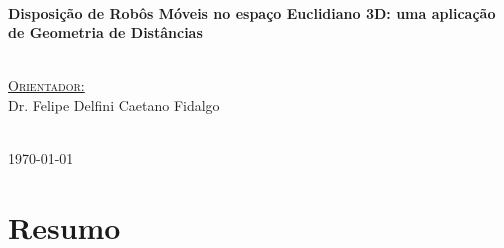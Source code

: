 \documentclass[11pt]{article}
\begin{document}
\begin{titlepage}


\HRule \\[0.4cm]
{ \LARGE \bfseries Disposição de Robôs Móveis no espaço Euclidiano 3D: uma aplicação de Geometria de Distâncias} \\ [0.4cm] %
\HRule \\[2.5cm]
 

\begin{minipage}{0.4\textwidth}
\begin{center} \large
\underline{\textsc{Orientador:}} \vspace{0.2cm} \\
Dr. Felipe Delfini Caetano Fidalgo 
\end{center}
\end{minipage} \\[2cm]


{\large \today} %


\vfill %

\end{titlepage}

\tableofcontents


\section{Resumo}
\end{document}
